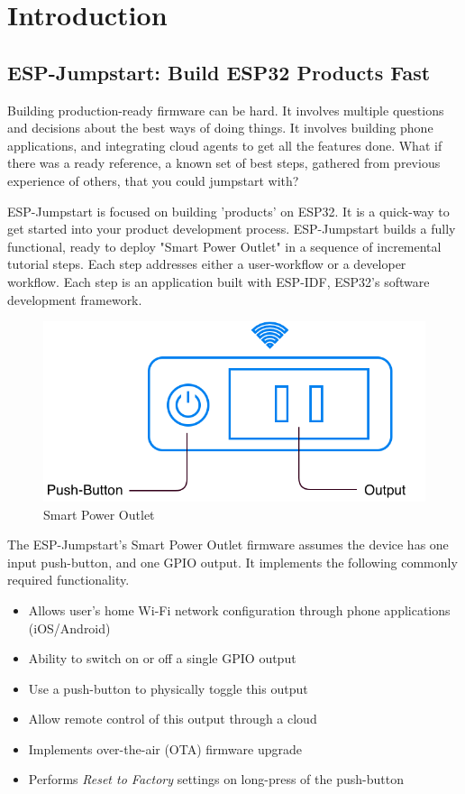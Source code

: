 \documentclass[main.tex]{subfiles}
\begin{document}
\chapter{Introduction}

\section{ESP-Jumpstart: Build ESP32 Products Fast}

Building production-ready firmware can be hard. It involves multiple questions and decisions about the best ways of doing things. It involves building phone applications, and integrating cloud agents to get all the features done. What if there was a ready reference, a known set of best steps, gathered from previous experience of others, that you could jumpstart with?

ESP-Jumpstart is focused on building 'products' on ESP32. It is a quick-way to get started into your product development process. ESP-Jumpstart builds a fully functional, ready to deploy "Smart Power Outlet" in a sequence of incremental tutorial steps. Each step addresses either a user-workflow or a developer workflow. Each step is an application built with ESP-IDF, ESP32's software development framework.

\begin{figure}[h!]
    \centering
    \includegraphics[scale=0.4]{../../_static/jumpstart-outlet.png}
    \caption{Smart Power Outlet}
    \label{fig:power_outlet}
\end{figure}

The ESP-Jumpstart's Smart Power Outlet firmware assumes the device has one input push-button, and one GPIO output. It implements the following commonly required functionality.

\begin{itemize}
  \item Allows user's home Wi-Fi network configuration through phone applications (iOS/Android)
  \item Ability to switch on or off a single GPIO output
  \item Use a push-button to physically toggle this output
  \item Allow remote control of this output through a cloud
  \item Implements over-the-air (OTA) firmware upgrade
  \item Performs \textit{Reset to Factory} settings on long-press of the push-button
\end{itemize}
\end{document}
